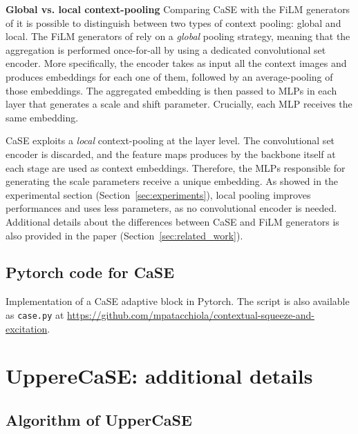 \documentclass{article}
\begin{document}
\textbf{Global vs. local context-pooling} Comparing CaSE with the FiLM generators of \cite{bronskill2021memory} it is possible to distinguish between two types of context pooling: global and local. The FiLM generators of \cite{bronskill2021memory} rely on a \emph{global} pooling strategy, meaning that the aggregation is performed once-for-all by using a dedicated convolutional set encoder. More specifically, the encoder takes as input all the context images and produces embeddings for each one of them, followed by an average-pooling of those embeddings. The aggregated embedding is then passed to MLPs in each layer that generates a scale and shift parameter. Crucially, each MLP receives the same embedding.

CaSE exploits a \emph{local} context-pooling at the layer level. The convolutional set encoder is discarded, and the feature maps produces by the backbone itself at each stage are used as context embeddings. Therefore, the MLPs responsible for generating the scale parameters receive a unique embedding. As showed in the experimental section (Section~\ref{sec:experiments}), local pooling improves performances and uses less parameters, as no convolutional encoder is needed. Additional details about the differences between CaSE and FiLM generators is also provided in the paper (Section~\ref{sec:related_work}).

\clearpage
\subsection{Pytorch code for CaSE}

Implementation of a CaSE adaptive block in Pytorch. The script is also available as \texttt{case.py} at \url{https://github.com/mpatacchiola/contextual-squeeze-and-excitation}.



\section{UppereCaSE: additional details} \label{appendix:sec_uppercase_details}

\subsection{Algorithm of UpperCaSE} \label{appendix:ssec_algorithm}
\end{document}

